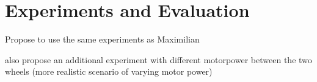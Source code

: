 \chapter{Experiments and Evaluation}
\label{cha:Experiments and Evaluation}


Propose to use the same experiments as Maximilian


also propose an additional experiment with different motorpower between the two wheels (more realistic scenario of varying motor power)

